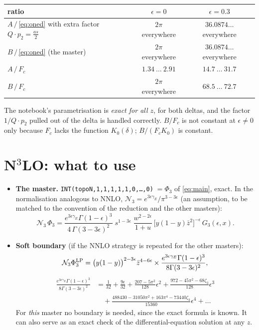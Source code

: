 \documentclass[11pt,a4paper]{article}
\newcommand{\ep}{\epsilon}
\newcommand{\zb}{\bar z}
\begin{document}
\begin{center}
\begin{tabular}{lcc}
\toprule
ratio & $\ep=0$ & $\ep=0.3$\\
\midrule
$A\,/\,$\eqref{eq:oned} with extra factor $Q\cdot p_2=\frac{as}2$ & $2\pi$ everywhere & $36.0874\ldots$ everywhere\\
$B\,/\,$\eqref{eq:oned} (the master) & $2\pi$ everywhere & $36.0874\ldots$ everywhere\\
$A\,/\,F_c$ & $1.34\ \dots\ 2.91$ & $14.7\ \dots\ 31.7$\\
$B\,/\,F_c$ & $2\pi$ everywhere & $68.5\ \dots\ 72.7$\\
\bottomrule
\end{tabular}
\end{center}
The notebook's parametrisation is \emph{exact for all $z$}, for both deltas, and the factor $1/Q\cdot p_2$ pulled out
of the delta is handled correctly. $B/F_c$ is not constant at $\ep\ne0$ only because $F_c$ lacks the function
$K_0(\delta)$; $B/(F_cK_0)$ is constant.

\section{\texorpdfstring{N$^3$LO: what to use}{N3LO: what to use}}
\label{sec:n3lo}
\begin{itemize}
\item \textbf{The master.} \texttt{INT(topoN,1,1,1,1,1,0,\dots,0)}$\;=\Phi_3$ of \eqref{eq:main}, exact. In the
  normalisation analogous to NNLO, $\mathcal N_3=e^{3\ep\gamma_E}/\pi^{3-3\ep}$ (an assumption, to be matched to the
  convention of the reduction and the other masters):
  \[ \mathcal N_3\,\Phi_3=\frac{e^{3\ep\gamma_E}\Gamma(1-\ep)^3}{4\,\Gamma(3-3\ep)^2}\;s^{1-3\ep}\;
     \frac{w^{2-2\ep}}{1+u}\,\big[y(1-y)\zb^2\big]^{-\ep}\,G_3(\ep,x).\]
\item \textbf{Soft boundary} (if the NNLO strategy is repeated for the other masters):
  \[\mathcal N_3\Phi_3^{\rm LP}=\big(y(1-y)\big)^{2-3\ep}\zb^{4-6\ep}\times
  \frac{e^{3\ep\gamma_E}\Gamma(1-\ep)^3}{8\Gamma(3-3\ep)^2},\]
  \begin{align*}\frac{e^{3\ep\gamma_E}\Gamma(1-\ep)^3}{8\Gamma(3-3\ep)^2}&=\frac1{32}+\frac{9\ep}{32}
   +\frac{207-5\pi^2}{128}\ep^2+\frac{972-45\pi^2-68\zeta_3}{128}\ep^3\\
   &\quad+\frac{488430-31050\pi^2+163\pi^4-73440\zeta_3}{15360}\ep^4+\dots\end{align*}
  For \emph{this} master no boundary is needed, since the exact formula is known. It can also serve as an exact
  check of the differential-equation solution at any $z$.
\end{itemize}
\end{document}
